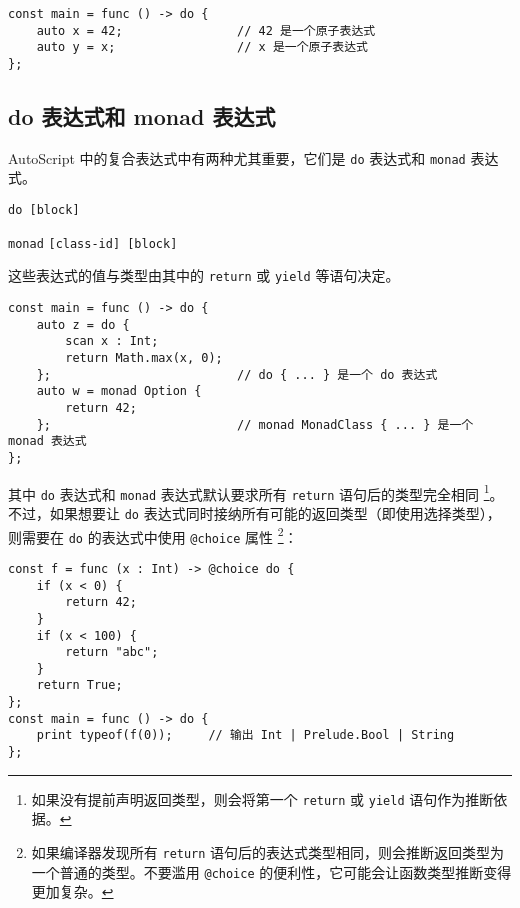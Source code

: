 \begin{lstlisting}
const main = func () -> do {
    auto x = 42;                // 42 是一个原子表达式
    auto y = x;                 // x 是一个原子表达式
};
\end{lstlisting}

\subsection{do 表达式和 monad 表达式}

AutoScript 中的复合表达式中有两种尤其重要，它们是 \lstinline!do! 表达式和 \lstinline!monad! 表达式。

\begin{grammar} \label{grm:do-expression}
	\lstinline!do [block]!
\end{grammar}

\begin{grammar} \label{grm:monad-expression}
	\lstinline!monad! \texttt{[class-id] [block]}
\end{grammar}

这些表达式的值与类型由其中的 \lstinline!return! 或 \lstinline!yield! 等语句决定。

\begin{lstlisting}
const main = func () -> do {
    auto z = do {
        scan x : Int;
        return Math.max(x, 0);
    };                          // do { ... } 是一个 do 表达式
    auto w = monad Option {
        return 42;
    };                          // monad MonadClass { ... } 是一个 monad 表达式
};
\end{lstlisting}

其中 \lstinline!do! 表达式和 \lstinline!monad! 表达式默认要求所有 \lstinline!return! 语句后的类型完全相同 \footnote{如果没有提前声明返回类型，则会将第一个 \lstinline!return! 或 \lstinline!yield! 语句作为推断依据。}。不过，如果想要让 \lstinline!do! 表达式同时接纳所有可能的返回类型（即使用选择类型），则需要在 \lstinline!do! 的表达式中使用 \lstinline!@choice! 属性 \footnote{如果编译器发现所有 \lstinline!return! 语句后的表达式类型相同，则会推断返回类型为一个普通的类型。不要滥用 \lstinline!@choice! 的便利性，它可能会让函数类型推断变得更加复杂。}：

\begin{lstlisting}
const f = func (x : Int) -> @choice do {
    if (x < 0) {
        return 42;
    }
    if (x < 100) {
        return "abc";
    }
    return True;
};
const main = func () -> do {
    print typeof(f(0));     // 输出 Int | Prelude.Bool | String
};
\end{lstlisting}


